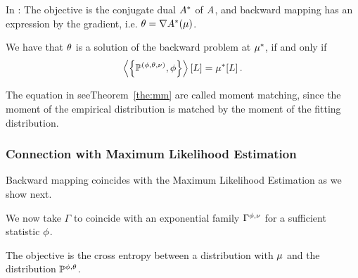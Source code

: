 In \cite{wainwright_graphical_2008}: The objective is the conjugate dual $A^*$ of $A$, and backward mapping has an expression by the gradient, i.e. $\theta = \nabla A^*(\mu)$.


\begin{theorem}\label{the:MM}
	We have that $\theta$ is a solution of the backward problem at $\mu^*$, if and only if 
		\[ \left\langle \left\{\mathbb{P}^{(\phi,\theta,\nu)},\phi\right\}\right\rangle \left[ L \right] = \mu^*[L] \, . \]
\end{theorem}

The equation in seeTheorem~\ref{the:mm} are called moment matching, since the moment of the empirical distribution is matched by the moment of the fitting distribution.




\subsubsection{Connection with Maximum Likelihood Estimation}

Backward mapping coincides with the Maximum Likelihood Estimation as we show next.

We now take $\Gamma$ to coincide with an exponential family $\Gamma^{\phi,\nu}$ for a sufficient statistic $\phi$.

The objective is the cross entropy between a distribution with $\mu$ and the distribution $\mathbb{P}^{\phi,\theta}$.

